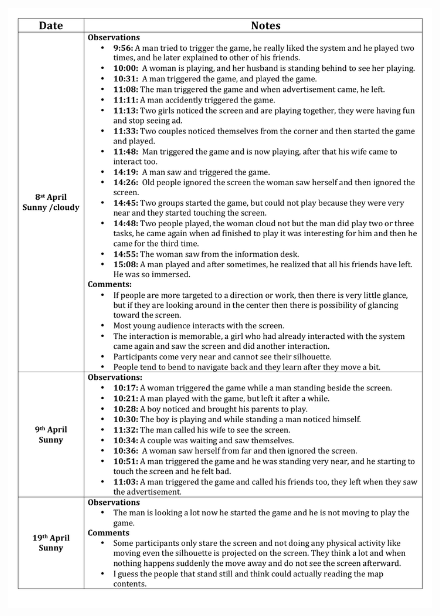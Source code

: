 \begin{appendices}
\begin{figure}[H]
 \centering 
    \includegraphics[width=\textwidth,height=0.8\textheight]{Appendices/9/Observation_notes.pdf}
     \label{app:EnhancedInteractiveobservationnotes}%
\end{figure}



\end{appendices}
